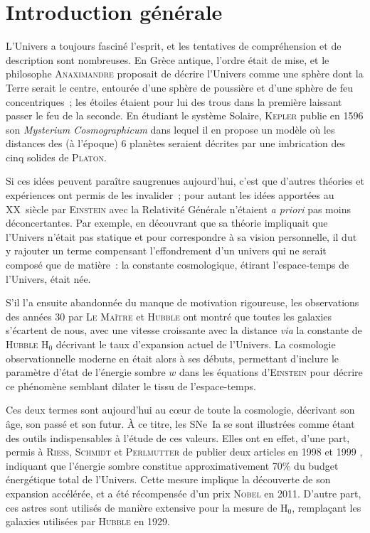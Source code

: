 \documentclass[../main/main.tex]{subfiles}
\begin{document}
\chapter*{Introduction g\'en\'erale}

L'Univers a toujours fasciné l'esprit, et les tentatives de compréhension et de
description sont nombreuses. En Grèce antique, l'ordre était de mise, et le
philosophe \textsc{Anaximandre} proposait de décrire l'Univers comme une sphère
dont la Terre serait le centre, entourée d'une sphère de poussière et d'une
sphère de feu concentriques~; les étoiles étaient pour lui des trous dans la
première laissant passer le feu de la seconde. En étudiant le système Solaire,
\textsc{Kepler} publie en 1596 son \textit{Mysterium Cosmographicum} dans lequel
il en propose un modèle où les distances des (à l'époque) 6 planètes seraient
décrites par une imbrication des cinq solides de \textsc{Platon}.

Si ces idées peuvent paraître saugrenues aujourd'hui, c'est que d'autres
théories et expériences ont permis de les invalider~; pour autant les idées
apportées au XX\ieme\ siècle par \textsc{Einstein} avec la Relativité Générale
\citep{einstein1915} n'étaient \textit{a priori} pas moins déconcertantes. Par
exemple, en découvrant que sa théorie impliquait que l'Univers n'était pas
statique et pour correspondre à sa vision personnelle, il dut y rajouter un
terme compensant l'effondrement d'un univers qui ne serait composé que de
matière~: la constante cosmologique, étirant l'espace-temps de l'Univers, était
née.

S'il l'a ensuite abandonnée du manque de motivation rigoureuse, les observations
des années 30 par \textsc{Le Maître} et \textsc{Hubble} \citep{hubble1929} ont
montré que toutes les galaxies s'écartent de nous, avec une vitesse croissante
avec la distance \textit{via} la constante de \textsc{Hubble} H$_0$ décrivant le
taux d'expansion actuel de l'Univers. La cosmologie observationnelle moderne en
était alors à ses débuts, permettant d'inclure le paramètre d'état de l'énergie
sombre $w$ dans les équations d'\textsc{Einstein} pour décrire ce phénomène
semblant dilater le tissu de l'espace-temps.

Ces deux termes sont aujourd'hui au cœur de toute la cosmologie, décrivant son
âge, son passé et son futur. À ce titre, les SNe~Ia se sont illustrées comme
étant des outils indispensables à l'étude de ces valeurs. Elles ont en effet,
d'une part, permis à \textsc{Riess}, \textsc{Schmidt} et \textsc{Perlmutter} de
publier deux articles en 1998 et 1999 \citep{riess1998, perlmutter1999},
indiquant que l'énergie sombre constitue approximativement 70\% du budget
énergétique total de l'Univers. Cette mesure implique la découverte de son
expansion accélérée, et a été récompensée d'un prix \textsc{Nobel} en 2011.
D'autre part, ces astres sont utilisés de manière extensive pour la mesure de
H$_0$, remplaçant les galaxies utilisées par \textsc{Hubble} en 1929.
\end{document}
